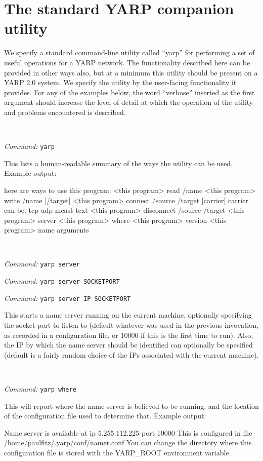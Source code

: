 \documentclass[a4]{article}
\newenvironment{packed_itemize}{
\begin{itemize}
  \renewcommand{\labelitemi}{$\triangleright$}
  \setlength{\itemsep}{1pt}
  \setlength{\parskip}{0pt}
  \setlength{\parsep}{0pt}
}{\end{itemize}}
\newcommand{\newusage}{\ \\\noindent\makebox[\textwidth]{\hrulefill}}
\newcommand{\usage}[1]{ \begin{packed_itemize} \item {\it Command:} {\tt #1} \end{packed_itemize}}
\begin{document}
\section{The standard YARP companion utility}

We specify a standard command-line 
utility called ``yarp'' for performing a set of
useful operations for a YARP network.  
%
The functionality described here 
can be provided in other ways also, but
at a minimum this utility should be present on a YARP 2.0 
system.
%
We specify the utility by the user-facing functionality
it provides.  For any of the examples below, the word ``verbose'' 
inserted as the first argument should increase the level of 
detail at which the operation of the utility and problems
encountered is described.


\newusage{}
\usage{yarp}
%
This lists a human-readable summary of the 
ways the utility can be used.  Example output:

\begin{code}
here are ways to use this program:
  <this program> read /name
  <this program> write /name [/target]
  <this program> connect /source /target [carrier]
     carrier can be: tcp udp mcast text
  <this program> disconnect /source /target
  <this program> server
  <this program> where
  <this program> version
  <this program> name {arguments}
\end{code}


\newusage{}
\usage{yarp server}
\usage{yarp server SOCKETPORT}
\usage{yarp server IP SOCKETPORT}
%
This starts a name server running on the current machine, optionally
specifying the socket-port to listen to (default whatever was used in
the previous invocation, as recorded in a configuration file, or 10000
if this is the first time to run).
%
Also, the IP by which the name server should be identified can
optionally be specified (default is a fairly random choice of
the IPs associated with the current machine).

\newusage{}
\usage{yarp where}
%
This will report where the name server is believed to be running,
and the location of the configuration file used to determine that.
Example output:

\begin{code}
Name server is available at ip 5.255.112.225 port 10000
This is configured in file /home/paulfitz/.yarp/conf/namer.conf
You can change the directory where this configuration file is stored
with the YARP\_ROOT environment variable.
\end{code}
\end{document}
